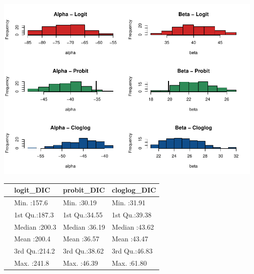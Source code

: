 \documentclass[]{article}
\newenvironment{Shaded}{\begin{snugshade}}{\end{snugshade}}
\newcommand{\DataTypeTok}[1]{\textcolor[rgb]{0.13,0.29,0.53}{#1}}
\newcommand{\KeywordTok}[1]{\textcolor[rgb]{0.13,0.29,0.53}{\textbf{#1}}}
\newcommand{\NormalTok}[1]{#1}
\newcommand{\OperatorTok}[1]{\textcolor[rgb]{0.81,0.36,0.00}{\textbf{#1}}}
\newcommand{\StringTok}[1]{\textcolor[rgb]{0.31,0.60,0.02}{#1}}
\begin{document}
\includegraphics{FinalProject-SDSII_files/figure-latex/unnamed-chunk-40-1.pdf}

\begin{Shaded}
\end{Shaded}

\begin{table}[!h]
\centering
\begin{tabular}{llll}
\toprule
  &   logit\_DIC &   probit\_DIC &  cloglog\_DIC\\
\midrule
\rowcolor{gray!6}   & Min.   :157.6 & Min.   :30.19 & Min.   :31.91\\
 & 1st Qu.:187.3 & 1st Qu.:34.55 & 1st Qu.:39.38\\
\rowcolor{gray!6}   & Median :200.3 & Median :36.19 & Median :43.62\\
 & Mean   :200.4 & Mean   :36.57 & Mean   :43.47\\
\rowcolor{gray!6}   & 3rd Qu.:214.2 & 3rd Qu.:38.62 & 3rd Qu.:46.83\\
\addlinespace
 & Max.   :241.8 & Max.   :46.39 & Max.   :61.80\\
\bottomrule
\end{tabular}
\end{table}
\end{document}

